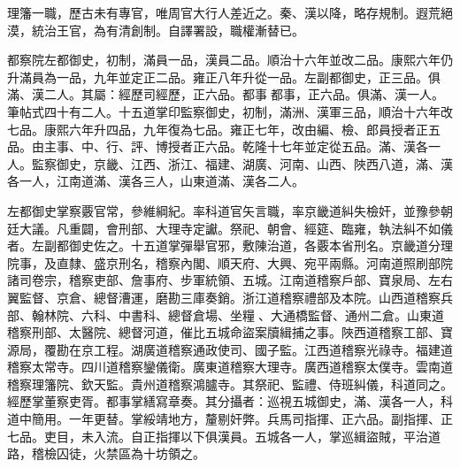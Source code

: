 \begin{pinyinscope}
理籓一職，歷古未有專官，唯周官大行人差近之。秦、漢以降，略存規制。遐荒絕漠，統治王官，為有清創制。自譯署設，職權漸替已。

都察院左都御史，初制，滿員一品，漢員二品。順治十六年並改二品。康熙六年仍升滿員為一品，九年並定正二品。雍正八年升從一品。左副都御史，正三品。俱滿、漢二人。其屬：經歷司經歷，正六品。都事都事，正六品。俱滿、漢一人。筆帖式四十有二人。十五道掌印監察御史，初制，滿洲、漢軍三品，順治十六年改七品。康熙六年升四品，九年復為七品。雍正七年，改由編、檢、郎員授者正五品。由主事、中、行、評、博授者正六品。乾隆十七年並定從五品。滿、漢各一人。監察御史，京畿、江西、浙江、福建、湖廣、河南、山西、陜西八道，滿、漢各一人，江南道滿、漢各三人，山東道滿、漢各二人。

左都御史掌察覈官常，參維綱紀。率科道官矢言職，率京畿道糾失檢奸，並豫參朝廷大議。凡重闢，會刑部、大理寺定讞。祭祀、朝會、經筵、臨雍，執法糾不如儀者。左副都御史佐之。十五道掌彈舉官邪，敷陳治道，各覈本省刑名。京畿道分理院事，及直隸、盛京刑名，稽察內閣、順天府、大興、宛平兩縣。河南道照刷部院諸司卷宗，稽察吏部、詹事府、步軍統領、五城。江南道稽察戶部、寶泉局、左右翼監督、京倉、總督漕運，磨勘三庫奏銷。浙江道稽察禮部及本院。山西道稽察兵部、翰林院、六科、中書科、總督倉場、坐糧、大通橋監督、通州二倉。山東道稽察刑部、太醫院、總督河道，催比五城命盜案牘緝捕之事。陜西道稽察工部、寶源局，覆勘在京工程。湖廣道稽察通政使司、國子監。江西道稽察光祿寺。福建道稽察太常寺。四川道稽察鑾儀衛。廣東道稽察大理寺。廣西道稽察太僕寺。雲南道稽察理籓院、欽天監。貴州道稽察鴻臚寺。其祭祀、監禮、侍班糾儀，科道同之。經歷掌董察吏胥。都事掌繕寫章奏。其分攝者：巡視五城御史，滿、漢各一人，科道中簡用。一年更替。掌綏靖地方，釐剔奸弊。兵馬司指揮、正六品。副指揮、正七品。吏目，未入流。自正指揮以下俱漢員。五城各一人，掌巡緝盜賊，平治道路，稽檢囚徒，火禁區為十坊領之。


\end{pinyinscope}
